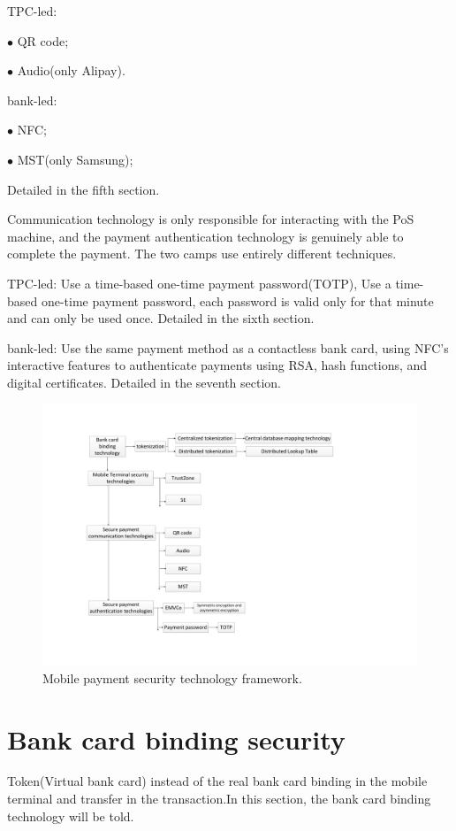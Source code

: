 \documentclass[journal]{IEEEtran}
\begin{document}
TPC-led:

$\bullet$ QR code;

$\bullet$ Audio(only Alipay).

bank-led:

$\bullet$ NFC;

$\bullet$ MST(only Samsung);

Detailed in the fifth section.

Communication technology is only responsible for interacting with the PoS machine, and the payment authentication technology is genuinely able to complete the payment. The two camps use entirely different techniques.

TPC-led: Use a time-based one-time payment password(TOTP), Use a time-based one-time payment password, each password is valid only for that minute and can only be used once. Detailed in the sixth section.

bank-led: Use the same payment method as a contactless bank card, using NFC's interactive features to authenticate payments using RSA, hash functions, and digital certificates. Detailed in the seventh section.




\begin{figure}[htbp]
\centerline{\includegraphics[scale=0.48]{tec.pdf}}
\caption{Mobile payment security technology framework.}
\label{fig}
\end{figure} 

\section{Bank card binding security}
Token(Virtual bank card) instead of the real bank card binding in the mobile terminal and transfer in the transaction.In this section, the bank card binding technology will be told. 
\end{document}
